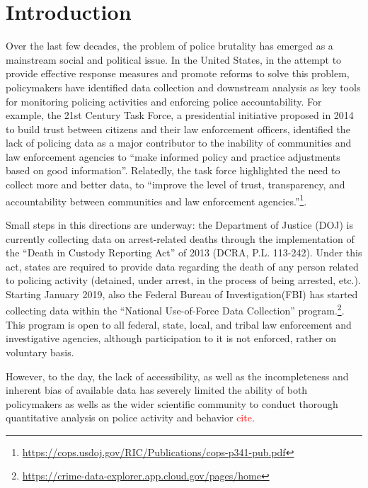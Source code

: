 

\section{Introduction}



Over the last few decades, the problem of police brutality has emerged as a mainstream social and political issue. In the United States, in the attempt to provide effective response measures and promote reforms to solve this problem, policymakers have identified data collection and downstream analysis as key tools for monitoring policing activities and enforcing police accountability. For example, the 21st Century Task Force, a presidential initiative proposed in 2014 to build trust between citizens and their law enforcement officers, identified the lack of policing data as a major contributor to the inability of communities and law enforcement agencies to ``make informed policy and practice adjustments based on good information''. Relatedly, the task force highlighted the need to collect more and better data, to ``improve the level of trust, transparency, and accountability between communities and law enforcement agencies.''\footnote{\url{https://cops.usdoj.gov/RIC/Publications/cops-p341-pub.pdf}}. 

Small steps in this directions are underway: the Department of Justice (DOJ) is currently collecting data on arrest-related deaths through the implementation of the ``Death in Custody Reporting Act'' of 2013 (DCRA, P.L. 113-242). Under this act, states are required to provide data regarding the death of any person related to policing activity (detained, under arrest, in the process of being arrested, etc.). Starting January 2019, also the Federal Bureau of Investigation(FBI) has started collecting data within the ``National Use-of-Force Data Collection'' program.\footnote{\url{https://crime-data-explorer.app.cloud.gov/pages/home}}. This program is open to all federal, state, local, and tribal law enforcement and investigative agencies, although participation to it is not enforced, rather on voluntary basis. 

However, to the day, the lack of accessibility, as well as the incompleteness and inherent bias of available data has severely limited the ability of both policymakers as wells as the wider scientific community to conduct thorough quantitative analysis on police activity and behavior \textcolor{red}{cite}. 

